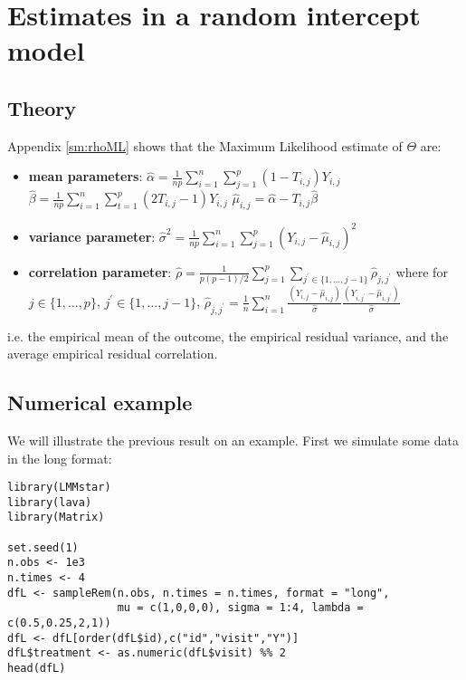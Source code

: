 \documentclass[12pt]{article}
\begin{document}
\clearpage

\section{Estimates in a random intercept model}
\label{sec:orgffc34b2}

\subsection{Theory}
\label{sec:org6b9f19f}

Appendix \ref{sm:rhoML} shows that the Maximum Likelihood estimate of \(\Theta\) are:
\begin{itemize}
\item \textbf{mean parameters}: \(\widehat{\alpha}= \frac{1}{np} \sum_{i=1}^n
  \sum_{j=1}^p (1-T_{i,j}) Y_{i,j}\) \newline
{} \(\widehat{\beta}=
  \frac{1}{np} \sum_{i=1}^n \sum_{t=1}^p (2 T_{i,j}-1) Y_{i,j}\) \newline
{} \(\widehat{\mu}_{i,j} = \widehat{\alpha} - T_{i,j}\widehat{\beta}\)
\item \textbf{variance parameter}: \(\widehat{\sigma}^2 =
  \frac{1}{np}\sum_{i=1}^n\sum_{j=1}^p (Y_{i,j}-\widehat{\mu}_{i,j})^2\)
\item \textbf{correlation parameter}: \(\widehat{\rho} =
  \frac{1}{p(p-1)/2}\sum_{j=1}^p \sum_{j^{\prime} \in
  \{1,\ldots,j-1\}}\widehat{\rho}_{j,j^{\prime}}\) \newline where for
\(j \in \{1,\ldots,p\}\), \(j^{\prime} \in \{1,\ldots,j-1\}\),
\(\widehat{\rho}_{j,j^{\prime}} = \frac{1}{n}\sum_{i=1}^n
  \frac{(Y_{i,j}-\widehat{\mu}_{i,j})}{\widehat{\sigma}}\frac{(Y_{i,j^{\prime}}-\widehat{\mu}_{i,j^{\prime}})}{\widehat{\sigma}}\)
\end{itemize}
i.e. the empirical mean of the outcome, the empirical residual
variance, and the average empirical residual correlation.

\subsection{Numerical example}
\label{sec:org553c8bb}

We will illustrate the previous result on an example. First we
simulate some data in the long format:
\lstset{language=r,label= ,caption= ,captionpos=b,numbers=none}
\begin{lstlisting}
library(LMMstar)
library(lava)
library(Matrix)

set.seed(1)
n.obs <- 1e3
n.times <- 4
dfL <- sampleRem(n.obs, n.times = n.times, format = "long",
                 mu = c(1,0,0,0), sigma = 1:4, lambda = c(0.5,0.25,2,1))
dfL <- dfL[order(dfL$id),c("id","visit","Y")]
dfL$treatment <- as.numeric(dfL$visit) %% 2
head(dfL)
\end{lstlisting}
\end{document}
